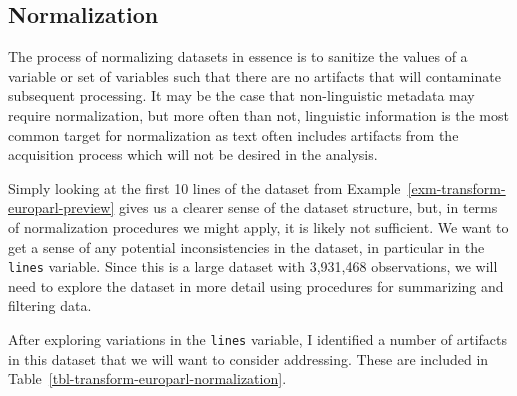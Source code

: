 \documentclass[
  letterpaper,
  krantz1]{latex/krantz-mod}
\theoremstyle{definition}
\theoremstyle{definition}
\theoremstyle{remark}
\begin{document}
\subsection{Normalization}\label{sec-transform-normalization}

The process of normalizing datasets in essence is to sanitize the values
of a variable or set of variables such that there are no artifacts that
will contaminate subsequent processing. It may be the case that
non-linguistic metadata may require normalization, but more often than
not, linguistic information is the most common target for normalization
as text often includes artifacts from the acquisition process which will
not be desired in the
analysis.

Simply looking at the first 10 lines of the dataset from
Example~\ref{exm-transform-europarl-preview} gives us a clearer sense of
the dataset structure, but, in terms of normalization procedures we
might apply, it is likely not sufficient. We want to get a sense of any
potential inconsistencies in the dataset, in particular in the
\texttt{lines} variable. Since this is a large dataset with 3,931,468
observations, we will need to explore the dataset in more detail using
procedures for summarizing and filtering data.

After exploring variations in the \texttt{lines} variable, I identified
a number of artifacts in this dataset that we will want to consider
addressing. These are included in
Table~\ref{tbl-transform-europarl-normalization}.
\end{document}
